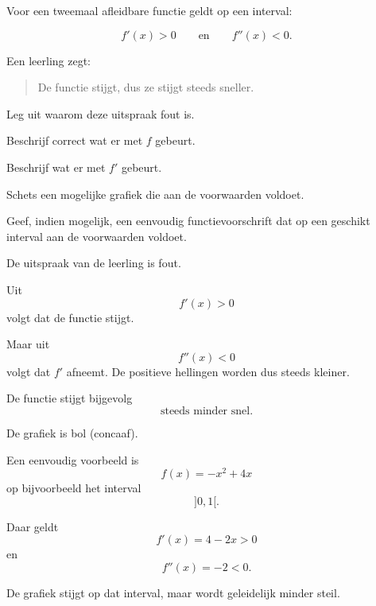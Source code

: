 \documentclass{ximera}
\begin{document}
\begin{oefening}{\oefG}

Voor een tweemaal afleidbare functie geldt op een interval:

\[
f'(x)>0
\qquad\text{en}\qquad
f''(x)<0.
\]

Een leerling zegt:

\begin{quote}
De functie stijgt, dus ze stijgt steeds sneller.
\end{quote}

\begin{question}
Leg uit waarom deze uitspraak fout is.
\end{question}

\begin{question}
Beschrijf correct wat er met $f$ gebeurt.
\end{question}

\begin{question}
Beschrijf wat er met $f'$ gebeurt.
\end{question}

\begin{question}
Schets een mogelijke grafiek die aan de voorwaarden voldoet.
\end{question}

\begin{question}
Geef, indien mogelijk, een eenvoudig functievoorschrift dat
op een geschikt interval aan de voorwaarden voldoet.
\end{question}

\begin{oplossing}

De uitspraak van de leerling is fout.

Uit
\[
f'(x)>0
\]
volgt dat de functie stijgt.

Maar uit
\[
f''(x)<0
\]
volgt dat $f'$ afneemt. De positieve hellingen worden dus steeds kleiner.

De functie stijgt bijgevolg
\[
\boxed{\text{steeds minder snel}}.
\]

De grafiek is bol (concaaf).

Een eenvoudig voorbeeld is
\[
f(x)=-x^2+4x
\]
op bijvoorbeeld het interval
\[
]0,1[.
\]

Daar geldt
\[
f'(x)=4-2x>0
\]
en
\[
f''(x)=-2<0.
\]

De grafiek stijgt op dat interval, maar wordt geleidelijk minder steil.

\end{oplossing}

\end{oefening}
\end{document}
